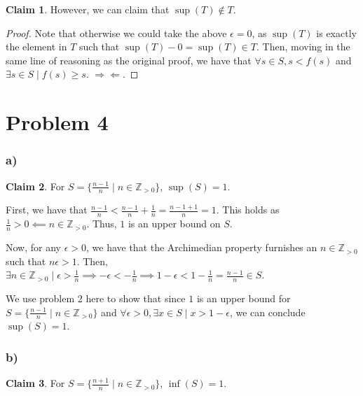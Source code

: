 \documentclass[12pt,letterpaper]{article}
\theoremstyle{definition}
\newtheorem*{claim}{Claim}
\newcommand{\contra}{\Rightarrow\!\Leftarrow}
\newcommand{\Zg}{\mathbb{Z}_{>0}}
\begin{document}
\begin{claim}
  However, we can claim that $\sup(T) \notin T$.
\end{claim}
  
\begin{proof}
  Note that otherwise we could take the above $\epsilon = 0$, as $\sup(T)$ is
  exactly  the element in $T$ such that $\sup(T) - 0 = \sup(T) \in T$. Then,
  moving in the same line of reasoning as the original proof, we have that
  $\forall s \in S, s < f(s)$ and $\exists s \in S \mid f(s) \geq s$. $\contra$.
\end{proof}

\section*{Problem 4}

\subsubsection*{a)}

\begin{claim}
  For $S = \{\frac{n-1}{n} \mid n \in \Zg\}$, $\sup(S) = 1$.
\end{claim}

First, we have that $\frac{n-1}{n} < \frac{n-1}{n} + \frac{1}{n} =
\frac{n-1+1}{n} = 1$. This holds as $\frac{1}{n} > 0 \impliedby n \in \Zg$.
Thus, $1$ is an upper bound on $S$.

Now, for any $\epsilon > 0$, we have that the Archimedian property furnishes an
$n \in \Zg$ such that $n\epsilon > 1$. Then, $\exists n \in \Zg \mid \epsilon >
\frac{1}{n} \implies -\epsilon < -\frac{1}{n} \implies 1 - \epsilon < 1 -
\frac{1}{n} = \frac{n-1}{n} \in S$. 

We use problem 2 here to show that since $1$ is an upper bound for $S =
\{\frac{n-1}{n} \mid n \in \Zg\}$ and $\forall \epsilon > 0, \exists x \in
S \mid x > 1 - \epsilon$, we can conclude $\sup(S) = 1$.

\subsubsection*{b)}

\begin{claim}
  For $S = \{\frac{n+1}{n} \mid n \in \Zg\}$, $\inf(S) = 1$.
\end{claim}
\end{document}
